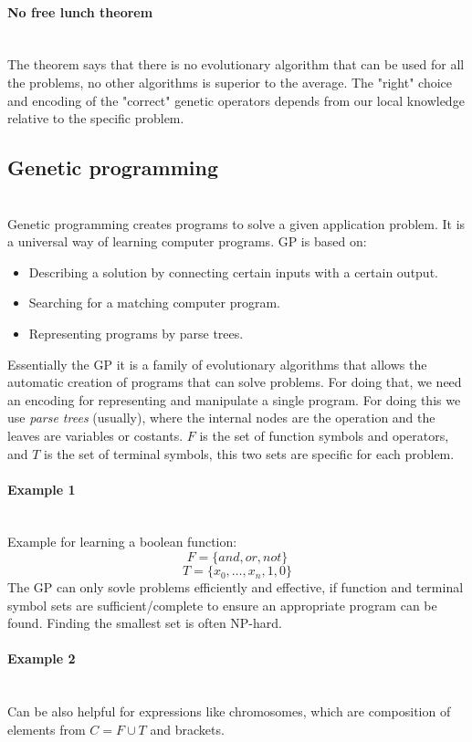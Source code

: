 \documentclass{article}
\begin{document}
\paragraph{No free lunch theorem}\mbox{}\\
The theorem says that there is no evolutionary algorithm that can be used for all the problems,
no other algorithms is superior to the average. The "right" choice and encoding of the
"correct" genetic operators depends from our local knowledge relative to the specific problem.

\subsection{Genetic programming}\mbox{}\\
Genetic programming creates programs to solve a given application problem. It is a universal way
of learning computer programs. GP is based on:
\begin{itemize}
    \item Describing a solution by connecting certain inputs with a certain output.
    \item Searching for a matching computer program.
    \item Representing programs by parse trees.
\end{itemize}
Essentially the GP it is a family of evolutionary algorithms that allows the automatic creation of
programs that can solve problems. For doing that, we need an encoding for representing and
manipulate a single program.
\newline\newline
For doing this we use \textit{parse trees} (usually), where the internal nodes are the operation
and the leaves are variables or costants. $F$ is the set of function symbols and operators, and
$T$ is the set of terminal symbols, this two sets are specific for each problem.

\paragraph{Example 1}\mbox{}\\
Example for learning a boolean function:
$$F=\{and, or,not\}$$
$$T=\{x_0,\dots,x_n,1,0\}$$
The GP can only sovle problems efficiently and effective, if function and terminal symbol sets
are sufficient/complete to ensure an appropriate program can be found. Finding the smallest
set is often NP-hard.

\paragraph{Example 2}\mbox{}\\
Can be also helpful for expressions like chromosomes, which are composition of elements from
$C=F\cup T$ and brackets.
\end{document}
